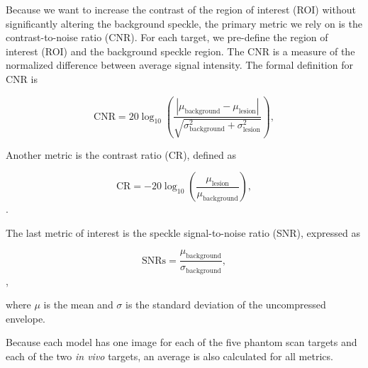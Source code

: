Because we want to increase the contrast of the region of interest (ROI) without significantly altering the background speckle, the primary metric we rely on is the contrast-to-noise ratio (CNR). For each target, we pre-define the region of interest (ROI) and the background speckle region. The CNR is a measure of the normalized difference between average signal intensity. The formal definition for CNR is


\begin{equation*}
  \textrm {CNR} = 20 \log _{10} \left ({\frac {|\mu _{\text {background}} - \mu _{\text {lesion}}|}{\sqrt {\sigma ^{2}_{\text {background}} + \sigma ^{2}_{\text {lesion}}}} }\right),\tag{4}
\end{equation*}

Another metric is the contrast ratio (CR), defined as

\begin{equation*}
  \textrm {CR} = -20 \log _{10} \left ({\frac {\mu _{\text {lesion}}}{\mu _{\text {background}}} }\right),\tag{3}
\end{equation*}.


The last metric of interest is the speckle signal-to-noise ratio (SNR), expressed as


\begin{equation*} \textrm {SNRs} = \frac {\mu _{\text {background}}}{\sigma _{\text {background}}},\tag{5}
\end{equation*},

where $\mu$ is the mean and $\sigma$ is the standard deviation of the uncompressed envelope.

Because each model has one image for each of the five phantom scan targets and each of the two \textit{in vivo} targets, an average is also calculated for all metrics.


%
